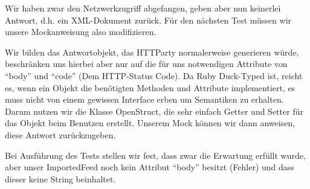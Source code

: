 Wir haben zwar den Netzwerkzugriff abgefangen, geben aber nun keinerlei Antwort, d.h. ein XML-Dokument zurück. Für den nächsten Test müssen wir unsere Mockanweisung also modifizieren.

\begin{ruby}[label=test/test\_imported\_feed.rb]
  
      
        
      


      
      
\end{ruby}

Wir bilden das Antwortobjekt, das HTTParty normalerweise generieren würde, beschränken uns hierbei aber nur auf die für uns notwendigen Attribute von "`body"' und "`code"' (Dem HTTP-Status Code). Da Ruby Duck-Typed ist, reicht es, wenn ein Objekt die benötigten Methoden und Attribute implementiert, es muss nicht von einem gewissen Interface erben um Semantiken zu erhalten. Darum nutzen wir die Klasse OpenStruct, die sehr einfach Getter und Setter für das Objekt beim Benutzen erstellt. Unserem Mock können wir dann anweisen, diese Antwort zurückzugeben.
\tddred

Bei Ausführung des Tests stellen wir fest, dass zwar die Erwartung erfüllt wurde, aber unser ImportedFeed noch kein Attribut "`body"' besitzt (Fehler) und dass dieser keine String beinhaltet.

\begin{ruby}[label=app/models/job.rb]
 
   
   
      
      
\end{ruby}

